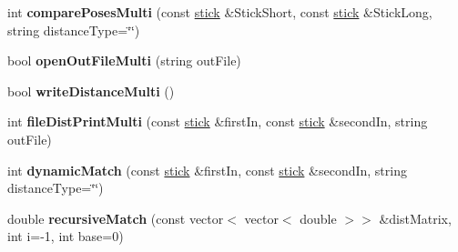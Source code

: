 \begin{DoxyCompactItemize}
\item 
\hypertarget{classstick_a1fd414c8d13d47d3499e6d7a52cad59c}{}int {\bfseries compare\+Poses\+Multi} (const \hyperlink{classstick}{stick} \&Stick\+Short, const \hyperlink{classstick}{stick} \&Stick\+Long, string distance\+Type=\char`\"{}\char`\"{})\label{classstick_a1fd414c8d13d47d3499e6d7a52cad59c}

\item 
\hypertarget{classstick_a9c0c4082acd5bbba8b426ec1d3b342d7}{}bool {\bfseries open\+Out\+File\+Multi} (string out\+File)\label{classstick_a9c0c4082acd5bbba8b426ec1d3b342d7}

\item 
\hypertarget{classstick_a20dd43162ff5a470dd885f93d22f683e}{}bool {\bfseries write\+Distance\+Multi} ()\label{classstick_a20dd43162ff5a470dd885f93d22f683e}

\item 
\hypertarget{classstick_aeb3520991bea6c463b868b9f06f2a1aa}{}int {\bfseries file\+Dist\+Print\+Multi} (const \hyperlink{classstick}{stick} \&first\+In, const \hyperlink{classstick}{stick} \&second\+In, string out\+File)\label{classstick_aeb3520991bea6c463b868b9f06f2a1aa}

\item 
\hypertarget{classstick_a9cda39d31239e185948101320d8a23b1}{}int {\bfseries dynamic\+Match} (const \hyperlink{classstick}{stick} \&first\+In, const \hyperlink{classstick}{stick} \&second\+In, string distance\+Type=\char`\"{}\char`\"{})\label{classstick_a9cda39d31239e185948101320d8a23b1}

\item 
\hypertarget{classstick_a7daee9e8ae759b1a2e8e498446f0df58}{}double {\bfseries recursive\+Match} (const vector$<$ vector$<$ double $>$$>$ \&dist\+Matrix, int i=-\/1, int base=0)\label{classstick_a7daee9e8ae759b1a2e8e498446f0df58}

\end{DoxyCompactItemize}
